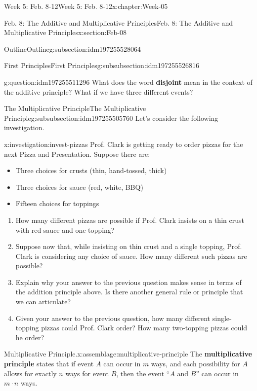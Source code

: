 \documentclass[oneside,10pt,]{book}
\newcommand{\terminology}[1]{\textbf{#1}}
\numberwithin{equation}{section}
\begin{document}
\begin{chapterptx}{Week 5: Feb. 8-12}{}{Week 5: Feb. 8-12}{}{}{x:chapter:Week-05}
\begin{sectionptx}{Feb. 8: The Additive and Multiplicative Principles}{}{Feb. 8: The Additive and Multiplicative Principles}{}{}{x:section:Feb-08}
\begin{subsectionptx}{Outline}{}{Outline}{}{}{g:subsection:idm197255528064}
\begin{subsubsectionptx}{First Principles}{}{First Principles}{}{}{g:subsubsection:idm197255526816}
\begin{question}{}{g:question:idm197255511296}
What does the word \terminology{disjoint} mean in the context of the additive principle? What if we have three different events?%
\end{question}
\end{subsubsectionptx}
%
%
\typeout{************************************************}
\typeout{************************************************}
%
\begin{subsubsectionptx}{The Multiplicative Principle}{}{The Multiplicative Principle}{}{}{g:subsubsection:idm197255505760}
Let's consider the following investigation.%
\begin{investigation}{}{x:investigation:invest-pizzas}%
Prof. Clark is getting ready to order pizzas for the next Pizza and Presentation. Suppose there are:%
%
\begin{itemize}[label=\textbullet]
\item{}Three choices for crusts (thin, hand-tossed, thick)%
\item{}Three choices for sauce (red, white, BBQ)%
\item{}Fifteen choices for toppings%
\end{itemize}
%
\begin{enumerate}
\item{}How many different pizzas are possible if Prof. Clark insists on a thin crust with red sauce and one topping?%
\item{}Suppose now that, while insisting on thin crust and a single topping, Prof. Clark is considering any choice of sauce. How many different such pizzas are possible?%
\item{}Explain why your answer to the previous question makes sense in terms of the addition principle above. Is there another general rule or principle that we can articulate?%
\item{}Given your answer to the previous question, how many different single-topping pizzas could Prof. Clark order? How many two-topping pizzas could he order?%
\end{enumerate}
\end{investigation}%
\begin{assemblage}{Multiplicative Principle.}{x:assemblage:multiplicative-principle}%
The \terminology{multiplicative principle} states that if event \(A\) can occur in \(m\) ways, and each possibility for \(A\) allows for exactly \(n\) ways for event \(B\), then the event ``\(A\) and \(B\)'' can occur in \(m \cdot n\) ways.%
\end{assemblage}

\end{subsubsectionptx}
\end{subsectionptx}
\end{sectionptx}
\end{chapterptx}
\end{document}
